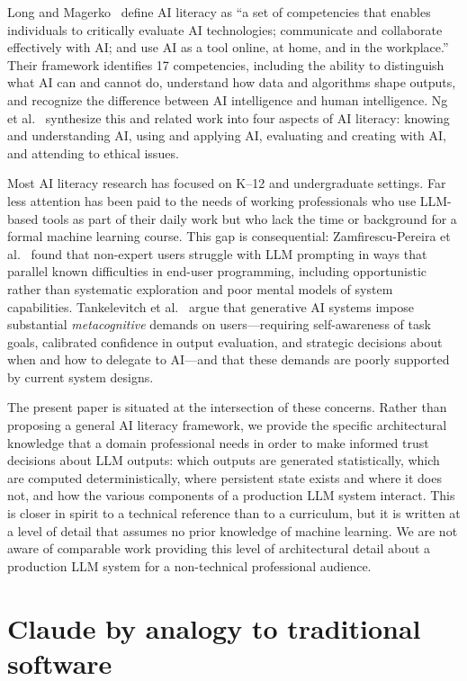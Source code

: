\documentclass[12pt]{article}
\begin{document}
Long and Magerko~\cite{long2020ai} define AI literacy as ``a set of competencies that enables individuals to critically evaluate AI technologies; communicate and collaborate effectively with AI; and use AI as a tool online, at home, and in the workplace.'' Their framework identifies 17 competencies, including the ability to distinguish what AI can and cannot do, understand how data and algorithms shape outputs, and recognize the difference between AI intelligence and human intelligence. Ng et al.~\cite{ng2021ai} synthesize this and related work into four aspects of AI literacy: knowing and understanding AI, using and applying AI, evaluating and creating with AI, and attending to ethical issues.

Most AI literacy research has focused on K--12 and undergraduate settings. Far less attention has been paid to the needs of working professionals who use LLM-based tools as part of their daily work but who lack the time or background for a formal machine learning course. This gap is consequential: Zamfirescu-Pereira et al.~\cite{zamfirescu2023johnny} found that non-expert users struggle with LLM prompting in ways that parallel known difficulties in end-user programming, including opportunistic rather than systematic exploration and poor mental models of system capabilities. Tankelevitch et al.~\cite{tankelevitch2024metacognitive} argue that generative AI systems impose substantial \emph{metacognitive} demands on users---requiring self-awareness of task goals, calibrated confidence in output evaluation, and strategic decisions about when and how to delegate to AI---and that these demands are poorly supported by current system designs.

The present paper is situated at the intersection of these concerns. Rather than proposing a general AI literacy framework, we provide the specific architectural knowledge that a domain professional needs in order to make informed trust decisions about LLM outputs: which outputs are generated statistically, which are computed deterministically, where persistent state exists and where it does not, and how the various components of a production LLM system interact. This is closer in spirit to a technical reference than to a curriculum, but it is written at a level of detail that assumes no prior knowledge of machine learning. We are not aware of comparable work providing this level of architectural detail about a production LLM system for a non-technical professional audience.

\section{Claude by analogy to traditional software}
\label{sec:analogy}
\end{document}
